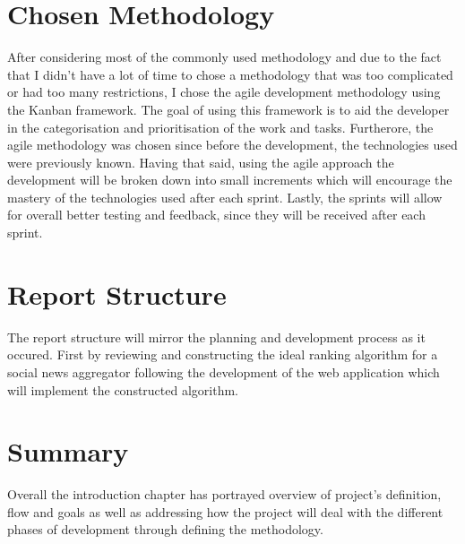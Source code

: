 \section{Chosen Methodology}
After considering most of the commonly used methodology and due to the fact that I didn't have a lot of time to chose a methodology that was too complicated or had too many restrictions, I chose the agile development methodology using the Kanban framework. The goal of using this framework is to aid the developer in the categorisation and prioritisation of the work and tasks. Furtherore, the agile methodology was chosen since before the development, the technologies used were previously known. Having that said, using the agile approach the development will be broken down into small increments which will encourage the mastery of the technologies used after each sprint. Lastly, the sprints will allow for overall better testing and feedback, since they will be received after each sprint.

\section{Report Structure}
The report structure will mirror the planning and development process as it occured. First by reviewing and constructing the ideal ranking algorithm for a social news aggregator following the development of the web application which will implement the constructed algorithm.

\section{Summary}
Overall the introduction chapter has portrayed overview of project's definition, flow and goals as well as addressing how the project will deal with the different phases of development through defining the methodology.

